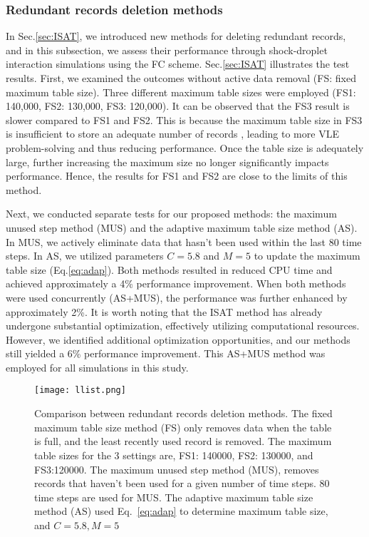 \subsubsection{Redundant records deletion methods}
\label{sec:delete}
In Sec.\ref{sec:ISAT}, we introduced new methods for deleting redundant records, and in this subsection, we assess their performance through shock-droplet interaction simulations using the FC scheme. Sec.\ref{sec:ISAT} illustrates the test results. First, we examined the outcomes without active data removal (FS: fixed maximum table size). Three different maximum table sizes were employed (FS1: 140,000, FS2: 130,000, FS3: 120,000). It can be observed that the FS3 result is slower compared to FS1 and FS2. This is because the maximum table size in FS3 is insufficient to store an adequate number of records , leading to more VLE problem-solving and thus reducing performance. Once the table size is adequately large, further increasing the maximum size no longer significantly impacts performance. Hence, the results for FS1 and FS2 are close to the limits of this method.

Next, we conducted separate tests for our proposed methods: the maximum unused step method (MUS) and the adaptive maximum table size method (AS). In MUS, we actively eliminate data that hasn't been used within the last 80 time steps. In AS, we utilized parameters $C = 5.8$ and $M = 5$ to update the maximum table size (Eq.\ref{eq:adap}). Both methods resulted in reduced CPU time and achieved approximately a 4\% performance improvement. When both methods were used concurrently (AS+MUS), the performance was further enhanced by approximately 2\%. It is worth noting that the ISAT method has already undergone substantial optimization, effectively utilizing computational resources. However, we identified additional optimization opportunities, and our methods still yielded a 6\% performance improvement. This AS+MUS method was employed for all simulations in this study.


\begin{figure}[htbp]
\centering
\texttt{[image: llist.png]}
\caption{Comparison between redundant records deletion methods. The fixed maximum table size method (FS) only removes data when the table is full, and the least recently used record is removed. The maximum table sizes for the 3 settings are, FS1: 140000, FS2: 130000, and FS3:120000. The maximum unused step method (MUS), removes records that haven't been used for a given number of time steps. 80 time steps are used for MUS. The adaptive maximum table size method (AS) used Eq.~\ref{eq:adap} to determine maximum table size, and $C=5.8, M=5$}
\label{droplet_delete} 
\end{figure}



